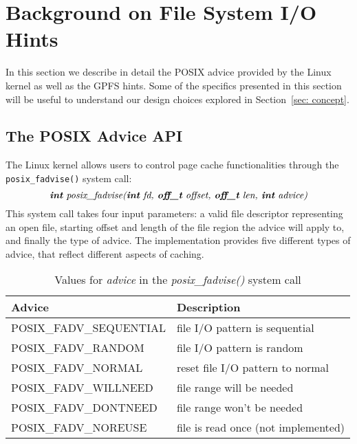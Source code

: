 \section{Background on File System I/O Hints}
\label{sec: background}
In this section we describe in detail the POSIX advice provided by the Linux kernel as well as the GPFS hints. Some of the specifics presented in this section will be useful to understand our design choices explored in Section~\ref{sec: concept}.

\subsection{The POSIX Advice API}
\label{subsec: posix_advice_api}
The Linux kernel allows users to control page cache functionalities through the \texttt{posix\_fadvise()} system call: $$\textit{\textbf{int} posix\_fadvise(\textbf{int} fd, \textbf{off\_t} offset, \textbf{off\_t} len, \textbf{int} advice)}$$ This system call takes four input parameters: a valid file descriptor representing an open file, starting offset and length of the file region the advice will apply to, and finally the type of advice. The implementation provides five different types of advice, that reflect different aspects of caching. 

\begin{table}[!htb]
\centering
{}
\caption{Values for \textit{advice} in the \textit{posix\_fadvise()} system call}
\begin{tabular}{KV}
\toprule
\bf \small Advice & \bf \small Description \\
\midrule
\small \ttfamily POSIX\_FADV\_SEQUENTIAL & \small file I/O pattern is sequential \\
\small \ttfamily POSIX\_FADV\_RANDOM & \small file I/O pattern is random \\
\small \ttfamily POSIX\_FADV\_NORMAL & \small reset file I/O pattern to normal \\
\small \ttfamily POSIX\_FADV\_WILLNEED & \small file range will be needed \\
\small \ttfamily POSIX\_FADV\_DONTNEED & \small file range won't be needed \\
\small \ttfamily POSIX\_FADV\_NOREUSE & \small file is read once (not implemented) \\
\bottomrule
\end{tabular}
\label{table: advice_table}
\end{table}

